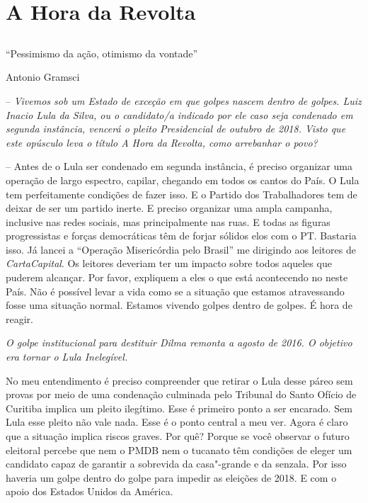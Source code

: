 \part{A Hora da Revolta}

\chapter*{}

\epigraph{``Pessimismo da ação, otimismo da vontade''}{Antonio Gramsci}


\newcommand{\falaG}{\itshape}
\newcommand{\falaM}{\normalfont}

\parindent0pt
\parskip4pt

 -- \itshape Vivemos sob um Estado de exceção em que golpes nascem dentro de
golpes. Luiz Inacio Lula da Silva, ou o candidato/a indicado por ele
caso seja condenado em segunda instância, vencerá o pleito Presidencial
de outubro de 2018. Visto que este opúsculo leva o título \emph{A Hora
da Revolta}, como arrebanhar o povo?

\normalfont{} -- \normalfont Antes de o Lula ser condenado em segunda instância, é preciso
organizar uma operação de largo espectro, capilar, chegando em todos os
cantos do País. O Lula tem perfeitamente condições de fazer isso. E o
Partido dos Trabalhadores tem de deixar de ser um partido inerte. E
preciso organizar uma ampla campanha, inclusive nas redes sociais, mas
principalmente nas ruas. E todas as figuras progressistas e forças
democráticas têm de forjar sólidos elos com o PT. Bastaria isso. Já
lancei a ``Operação Misericórdia pelo Brasil'' me dirigindo aos leitores
de \emph{CartaCapital}. Os leitores deveriam ter um impacto sobre todos
aqueles que puderem alcançar. Por favor, expliquem a eles o que está
acontecendo no neste País. Não é possível levar a vida como se a
situação que estamos atravessando fosse uma situação normal. Estamos
vivendo golpes dentro de golpes. É hora de reagir.

\falaG O golpe institucional para destituir Dilma remonta a agosto de 2016.
O objetivo era tornar o Lula Inelegível.

\falaM No meu entendimento é preciso compreender que retirar o Lula desse
páreo sem provas por meio de uma condenação culminada pelo Tribunal do
Santo Ofício de Curitiba implica um pleito ilegítimo. Esse é primeiro
ponto a ser encarado. Sem Lula esse pleito não vale nada. Esse é o ponto
central a meu ver. Agora é claro que a situação implica riscos graves.
Por quê? Porque se você observar o futuro eleitoral percebe que nem o
PMDB nem o tucanato têm condições de eleger um candidato capaz de
garantir a sobrevida da casa"-grande e da senzala. Por isso haveria um
golpe dentro do golpe para impedir as eleições de 2018. E com o apoio
dos Estados Unidos da América.

